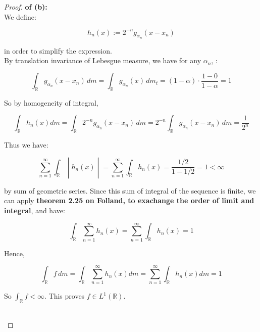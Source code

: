 \begin{proof}

\textbf{of (b):}\\
We define:

\[h_{n}(x) := 2^{- n}g_{\alpha_{n}}(x - x_{n})\]

in order to simplify the expression.\\
By translation invariance of Lebesgue measure, we have for any \(\alpha_{n}\), :

\[\int_{\mathbb{R}}g_{\alpha_{n}}(x - x_{n})\, dm = \int_{\mathbb{R}}g_{\alpha_{n}}(x)\, dm_{t} = (1 - \alpha) \cdot \frac{1 - 0}{1 - \alpha} = 1\]

So by homogeneity of integral,

\[\int_{\mathbb{R}}h_{n}(x) dm = \int_{\mathbb{R}}2^{- n}g_{\alpha_{n}}(x - x_{n})\, dm = 2^{- n}\int_{\mathbb{R}}g_{\alpha_{n}}(x - x_{n})\, dm = \frac{1}{2^{n}}\]

Thus we have:

\[\left. \sum\limits_{n = 1}^{\infty}\int_{\mathbb{R}} \middle| h_{n}(x) \middle| = \sum\limits_{n = 1}^{\infty}\int_{\mathbb{R}}h_{n}(x) = \frac{1/2}{1 - 1/2} = 1 < \infty \right.\]

by sum of geometric series. Since this sum of integral of the sequence is finite, we can apply \textbf{theorem 2.25 on Folland, to exachange the order of limit and integral}, and have:

\[\int_{\mathbb{R}}\sum\limits_{n = 1}^{\infty}h_{n}(x) = \sum\limits_{n = 1}^{\infty}\int_{\mathbb{R}}h_{n}(x) = 1\]

Hence,

\[\int_{\mathbb{R}}f\, dm = \int_{\mathbb{R}}\sum\limits_{n = 1}^{\infty}h_{n}(x)dm = \sum\limits_{n = 1}^{\infty}\int_{\mathbb{R}}h_{n}(x)dm = 1\]

So \(\int_{\mathbb{R}}f < \infty\). This proves \(f \in L^{1}(\mathbb{R})\).\\
\strut \\

\end{proof}

